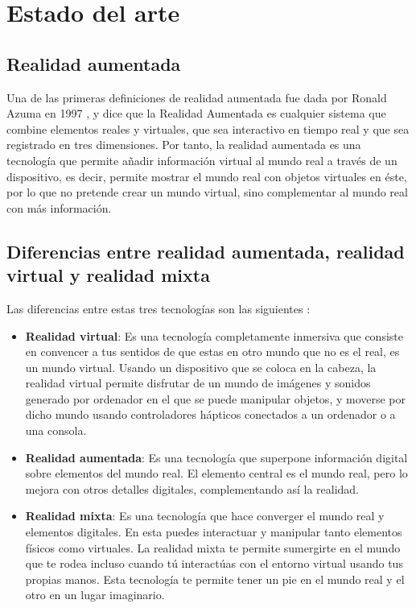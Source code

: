 \chapter{Estado del arte}
\label{ch:estado}

\section{Realidad aumentada}
Una de las primeras definiciones de realidad aumentada fue dada por Ronald Azuma en 1997 \cite{azuma}, y dice que la Realidad Aumentada es cualquier sistema que combine elementos reales y virtuales, que sea interactivo en tiempo real y que sea registrado en tres dimensiones. Por tanto, la realidad aumentada es una tecnología que permite añadir información virtual al mundo real a través de un dispositivo, es decir, permite mostrar el mundo real con objetos virtuales en éste, por lo que no pretende crear un mundo virtual, sino complementar al mundo real con más información.

\section{Diferencias entre realidad aumentada, realidad virtual y realidad mixta}
Las diferencias entre estas tres tecnologías son las siguientes \cite{intel}:

\begin{itemize}
  \item \textbf{Realidad virtual}: Es una tecnología completamente inmersiva que consiste en convencer a tus sentidos de que estas en otro mundo que no es el real, es un mundo virtual. Usando un dispositivo que se coloca en la cabeza, la realidad virtual permite disfrutar de un mundo de imágenes y sonidos generado por ordenador en el que se puede manipular objetos, y moverse por dicho mundo usando controladores hápticos conectados a un ordenador o a una consola.

  \item \textbf{Realidad aumentada}: Es una tecnología que superpone información digital sobre elementos del mundo real. El elemento central es el mundo real, pero lo mejora con otros detalles digitales, complementando así la realidad.

  \item \textbf{Realidad mixta}: Es una tecnología que hace converger el mundo real y elementos digitales. En esta puedes interactuar y manipular tanto elementos físicos como virtuales. La realidad mixta te permite sumergirte en el mundo que te rodea incluso cuando tú interactúas con el entorno virtual usando tus propias manos. Esta tecnología te permite tener un pie en el mundo real y el otro en un lugar imaginario.
\end{itemize}

